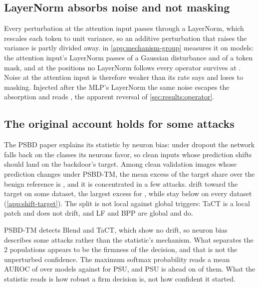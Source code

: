 \subsection{LayerNorm absorbs noise and not masking}
\label{sec:mechanism:layernorm}

Every perturbation at the attention input passes through a LayerNorm, which rescales each token to unit variance, so an additive perturbation that raises the variance is partly divided away.  in \cref{app:mechanism-group} measures it on \AbsorptionModels{} models: the attention input's LayerNorm passes \AbsorptionAttentionInputGaussianSurvival{} of a Gaussian disturbance and \AbsorptionAttentionInputTokenMaskSurvival{} of a token mask, and at the positions no LayerNorm follows every operator survives at \AbsorptionControlSurvival{}. Noise at the attention input is therefore weaker than its rate says and loses \StaircaseOperatorsBeforeAttentionNormGaussianGain{} to masking. Injected after the MLP's LayerNorm the same noise escapes the absorption and reads \StaircaseOperatorsBeforeMlpGaussianAuroc{}, the apparent reversal of \cref{sec:results:operator}.

\subsection{The original account holds for some attacks}
\label{sec:mechanism:phenomenon}

The PSBD paper explains its statistic by neuron bias: under dropout the network falls back on the classes its neurons favor, so clean inputs whose prediction shifts should land on the backdoor's target. Among clean validation images whose prediction changes under PSBD-TM, the mean excess of the target share over the benign reference is \ShiftToTargetExcessAll{}, and it is concentrated in a few attacks. \ShiftToTargetDriftAttacks{} drift toward the target on some dataset, the largest excess \ShiftToTargetLargestExcess{} for \ShiftToTargetLargestCell{}, while \ShiftToTargetNoDriftAttacks{} stay below \ShiftToTargetNoDriftFloor{} on every dataset (\cref{app:shift-target}). The split is not local against global triggers: TaCT is a local patch and does not drift, and LF and BPP are global and do.

PSBD-TM detects Blend and TaCT, which show no drift, so neuron bias describes some attacks rather than the statistic's mechanism. What separates the 2 populations appears to be the firmness of the decision, and that is not the unperturbed confidence. The maximum softmax probability reads a mean AUROC of \ConfidenceNullAuroc{} over \ConfidenceNullCheckpoints{} models against \ConfidenceNullPsuAuroc{} for PSU, and PSU is ahead on \ConfidenceNullPsuWins{} of them. What the statistic reads is how robust a firm decision is, not how confident it started.
